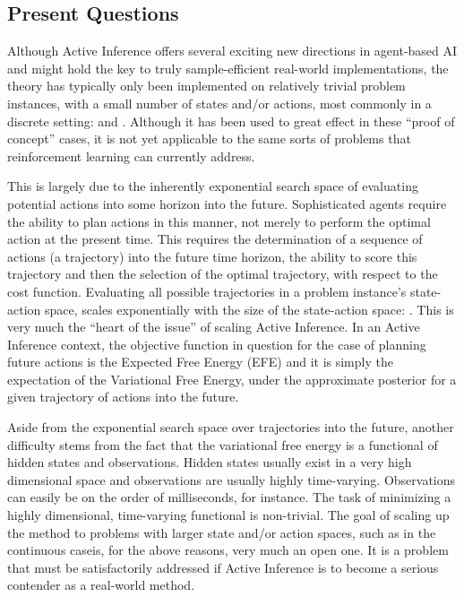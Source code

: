 \documentclass[onecolumn]{IEEEtran}
\begin{document}
\subsection{Present Questions}

Although Active Inference offers several exciting new directions in agent-based AI and might hold the key to truly sample-efficient real-world implementations, the theory has typically only been implemented on relatively trivial problem instances, with a small number of states and/or actions, most commonly in a discrete setting: \textcite{Uncertainty_Epistemics_AIF_Saccad} and \textcite{AIF-Epistemic-Value}. Although it has been used to great effect in these ``proof of concept'' cases, it is not yet applicable to the same sorts of problems that reinforcement learning can currently address. 

This is largely due to the inherently exponential search space of evaluating potential actions into some horizon into the future. Sophisticated agents require the ability to plan actions in this manner, not merely to perform the optimal action at the present time. This requires the determination of a sequence of actions (a trajectory) into the future time horizon, the ability to score this trajectory and then the selection of the optimal trajectory, with respect to the cost function. Evaluating all possible trajectories in a problem instance's state-action space, scales exponentially with the size of the state-action space: \textcite{Applications-of-FEP-Machine-Learning-Neuroscience}. This is very much the ``heart of the issue'' of scaling Active Inference. In an Active Inference context, the objective function in question for the case of planning future actions is the Expected Free Energy (EFE) and it is simply the expectation of the Variational Free Energy, under the approximate posterior for a given trajectory of actions into the future. 

Aside from the exponential search space over trajectories into the future, another difficulty stems from the fact that the variational free energy is a functional of hidden states and observations. Hidden states usually exist in a very high dimensional space and observations are usually highly time-varying. Observations can easily be on the order of milliseconds, for instance. The task of minimizing a highly dimensional, time-varying functional is non-trivial. The goal of scaling up the method to problems with larger state and/or action spaces, such as in the continuous caseis, for the above reasons, very much an open one. It is a problem that must be satisfactorily addressed if Active Inference is to become a serious contender as a real-world method.  
\end{document}
